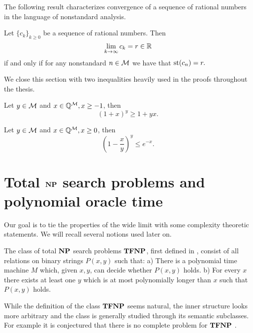 The following result characterizes convergence of a sequence of rational numbers in the language of nonstandard analysis.

\begin{thrm*}
Let $\{c_k\}_{k\geq 0}$ be a sequence of rational numbers. Then \[\lim_{k\to\infty}c_k = r \in \mathbb{R}\]
if and only if for any nonstandard $n\in \mathcal{M}$ we have that
$\text{st}(c_n)=r.$
\end{thrm*}

We close this section with two inequalities heavily used in the proofs throughout the thesis.

\begin{thrm*}
Let $y \in \mathcal{M}$ and $x\in \mathbb{Q}^{\mathcal{M}}, x\geq -1$, then
\[(1+x)^y \geq 1+yx.\]
\end{thrm*}

\begin{thrm*}
Let $y \in \mathcal{M}$ and $x\in \mathbb{Q}^{\mathcal{M}}, x\geq 0$, then
\[\left(1-\frac{x}{y}\right)^y \leq e^{-x}.\]
\end{thrm*}

\section*{Total $\textbf{NP}$ search problems and polynomial oracle time}

Our goal is to tie the properties of the wide limit with some complexity theoretic statements. We will recall several notions used later on.

The class of total $\textbf{NP}$ search problems $\textbf{TFNP}$, first defined in \cite{megiddo1991total}, consist of all relations on binary strings $P(x,y)$ such that: a) There is a polynomial time machine $M$ which, given $x,y$, can decide whether $P(x,y)$ holds. b) For every $x$ there exists at least one $y$ which is at most polynomially longer than $x$ such that $P(x,y)$ holds.

While the definition of the class $\textbf{TFNP}$ seems natural, the inner structure looks more arbitrary and the class is generally studied through its semantic subclasses. For example it is conjectured that there is no complete problem for $\textbf{TFNP}$ \cite{goldberg2018tfnp}.

